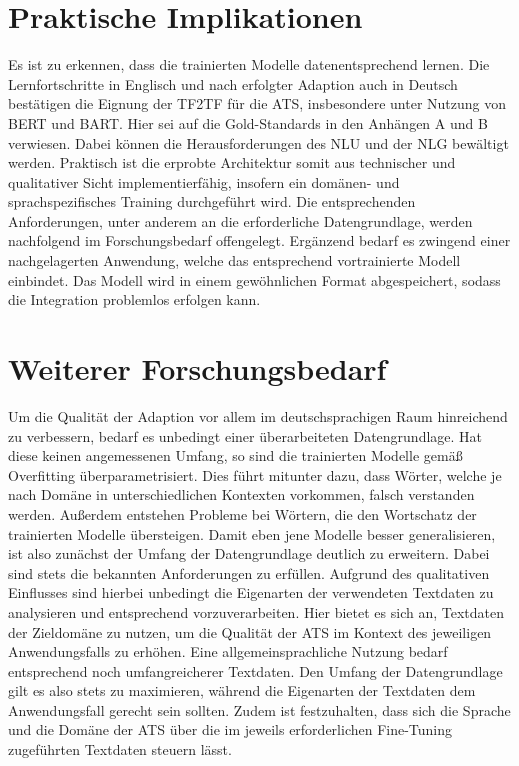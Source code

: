 \section{Praktische Implikationen}
\noindent
Es ist zu erkennen, dass die trainierten Modelle datenentsprechend lernen. Die Lernfortschritte in Englisch und nach erfolgter Adaption auch in Deutsch bestätigen die Eignung der \ac{TF2TF} für die \ac{ATS}, insbesondere unter Nutzung von \ac{BERT} und \ac{BART}. Hier sei auf die Gold-Standards in den Anhängen A und B verwiesen. Dabei können die Herausforderungen des \ac{NLU} und der \ac{NLG} bewältigt werden. Praktisch ist die erprobte Architektur somit aus technischer und qualitativer Sicht implementierfähig, insofern ein domänen- und sprachspezifisches Training durchgeführt wird. Die entsprechenden Anforderungen, unter anderem an die erforderliche Datengrundlage, werden nachfolgend im Forschungsbedarf offengelegt. Ergänzend bedarf es zwingend einer nachgelagerten Anwendung, welche das entsprechend vortrainierte Modell einbindet. Das Modell wird in einem gewöhnlichen Format abgespeichert, sodass die Integration problemlos erfolgen kann.


\section{Weiterer Forschungsbedarf}
\noindent
Um die Qualität der Adaption vor allem im deutschsprachigen Raum hinreichend zu verbessern, bedarf es unbedingt einer überarbeiteten Datengrundlage. Hat diese keinen angemessenen Umfang, so sind die trainierten Modelle gemäß Overfitting überparametrisiert. Dies führt mitunter dazu, dass Wörter, welche je nach Domäne in unterschiedlichen Kontexten vorkommen, falsch verstanden werden. Außerdem entstehen Probleme bei Wörtern, die den Wortschatz der trainierten Modelle übersteigen. Damit eben jene Modelle besser generalisieren, ist also zunächst der Umfang der Datengrundlage deutlich zu erweitern. Dabei sind stets die bekannten Anforderungen zu erfüllen. Aufgrund des qualitativen Einflusses sind hierbei unbedingt die Eigenarten der verwendeten Textdaten zu analysieren und entsprechend vorzuverarbeiten. Hier bietet es sich an, Textdaten der Zieldomäne zu nutzen, um die Qualität der \ac{ATS} im Kontext des jeweiligen Anwendungsfalls zu erhöhen. Eine allgemeinsprachliche Nutzung bedarf entsprechend noch umfangreicherer Textdaten. Den Umfang der Datengrundlage gilt es also stets zu maximieren, während die Eigenarten der Textdaten dem Anwendungsfall gerecht sein sollten. Zudem ist festzuhalten, dass sich die Sprache und die Domäne der \ac{ATS} über die im jeweils erforderlichen Fine-Tuning zugeführten Textdaten steuern lässt.\\

